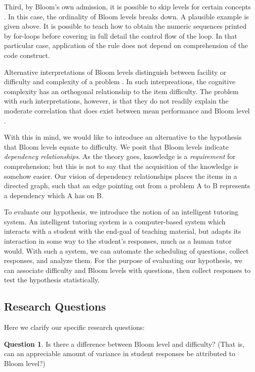 \documentclass[]{interact}
\theoremstyle{plain}
\theoremstyle{definition}
\theoremstyle{remark}
\begin{document}
Third, by Bloom's own admission, it is possible to skip levels for certain
concepts \citep{bloom1956}.  In this case, the ordinality of Bloom levels
breaks down.  A plausible example is given above.  It is possible to teach how
to obtain the numeric sequences printed by for-loops before covering in full
detail the control flow of the loop.  In that particular case, application of
the rule does not depend on comprehension of the code construct.

Alternative interpretations of Bloom levels distinguish between facility or
difficulty and complexity of a problem \citep{hill1981testing,
thompson2008bloom}.  In such interpreations, the cognitive complexity has an
orthogonal relationship to the item difficulty.  The problem with such
interpretations, however, is that they do not readily explain the moderate
correlation that does exist between mean performance and Bloom level
\citep{hill1981testing}.

With this in mind, we would like to introduce an alternative to the hypothesis
that Bloom levels equate to difficulty.  We posit that Bloom levels indicate
\emph{dependency relationships}.  As the theory goes, knowledge is a
\emph{requirement} for comprehension; but this is not to say that the
acquisition of the knowledge is somehow easier.  Our vision of dependency
relationships places the items in a directed graph, such that an edge pointing
out from a problem A to B represents a dependency which A has on B.

To evaluate our hypothesis, we introduce the notion of an intelligent tutoring
system.  An intelligent tutoring system is a computer-based system which
interacts with a student with the end-goal of teaching material, but adapts its
interaction in some way to the student's responses, much as a human tutor
would.  With such a system, we can automate the scheduling of questions,
collect responses, and analyze them. For the purpose of evaluating our
hypothesis, we can associate difficulty and Bloom levels with questions, then
collect responses to test the hypothesis statistically.

\subsection{Research Questions}

Here we clarify our specific research questions:

\textbf{Question 1}. Is there a difference between Bloom level and difficulty?
(That is, can an appreciable amount of variance in student responses be
attributed to Bloom level?)
\end{document}
